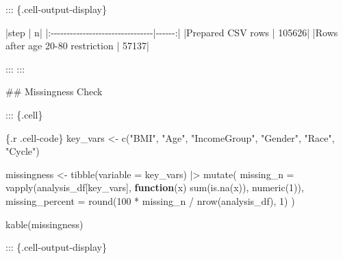 \documentclass[
  letterpaper,
  DIV=11,
  numbers=noendperiod,
  oneside]{scrreprt}
\newenvironment{Shaded}{\begin{snugshade}}{\end{snugshade}}
\newcommand{\AttributeTok}[1]{\textcolor[rgb]{0.40,0.45,0.13}{#1}}
\newcommand{\ControlFlowTok}[1]{\textcolor[rgb]{0.00,0.23,0.31}{\textbf{#1}}}
\newcommand{\DecValTok}[1]{\textcolor[rgb]{0.68,0.00,0.00}{#1}}
\newcommand{\FunctionTok}[1]{\textcolor[rgb]{0.28,0.35,0.67}{#1}}
\newcommand{\InformationTok}[1]{\textcolor[rgb]{0.37,0.37,0.37}{#1}}
\newcommand{\NormalTok}[1]{\textcolor[rgb]{0.00,0.23,0.31}{#1}}
\newcommand{\OtherTok}[1]{\textcolor[rgb]{0.00,0.23,0.31}{#1}}
\newcommand{\PreprocessorTok}[1]{\textcolor[rgb]{0.68,0.00,0.00}{#1}}
\newcommand{\SpecialCharTok}[1]{\textcolor[rgb]{0.37,0.37,0.37}{#1}}
\newcommand{\StringTok}[1]{\textcolor[rgb]{0.13,0.47,0.30}{#1}}
\begin{document}
\begin{Shaded}
\begin{Highlighting}[numbers=left,,]
\NormalTok{::: \{.cell{-}output{-}display\}}


\PreprocessorTok{|}\NormalTok{step                             }\PreprocessorTok{|}\NormalTok{      n}\PreprocessorTok{|}
\PreprocessorTok{|:{-}{-}{-}{-}{-}{-}{-}{-}{-}{-}{-}{-}{-}{-}{-}{-}{-}{-}{-}{-}{-}{-}{-}{-}{-}{-}{-}{-}{-}{-}{-}{-}|{-}{-}{-}{-}{-}{-}:|}
\PreprocessorTok{|}\NormalTok{Prepared CSV rows                }\PreprocessorTok{|}\NormalTok{ 105626}\PreprocessorTok{|}
\PreprocessorTok{|}\NormalTok{Rows after age 20{-}80 restriction }\PreprocessorTok{|}\NormalTok{  57137}\PreprocessorTok{|}


\NormalTok{:::}
\NormalTok{:::}


\FunctionTok{\#\# Missingness Check}


\NormalTok{::: \{.cell\}}

\InformationTok{\textasciigrave{}\textasciigrave{}\textasciigrave{}\{.r .cell{-}code\}}
\NormalTok{key\_vars }\OtherTok{\textless{}{-}} \FunctionTok{c}\NormalTok{(}\StringTok{"BMI"}\NormalTok{, }\StringTok{"Age"}\NormalTok{, }\StringTok{"IncomeGroup"}\NormalTok{, }\StringTok{"Gender"}\NormalTok{, }\StringTok{"Race"}\NormalTok{, }\StringTok{"Cycle"}\NormalTok{)}

\NormalTok{missingness }\OtherTok{\textless{}{-}} \FunctionTok{tibble}\NormalTok{(}\AttributeTok{variable =}\NormalTok{ key\_vars) }\SpecialCharTok{|\textgreater{}}
  \FunctionTok{mutate}\NormalTok{(}
    \AttributeTok{missing\_n =} \FunctionTok{vapply}\NormalTok{(analysis\_df[key\_vars], }\ControlFlowTok{function}\NormalTok{(x) }\FunctionTok{sum}\NormalTok{(}\FunctionTok{is.na}\NormalTok{(x)), }\FunctionTok{numeric}\NormalTok{(}\DecValTok{1}\NormalTok{)),}
    \AttributeTok{missing\_percent =} \FunctionTok{round}\NormalTok{(}\DecValTok{100} \SpecialCharTok{*}\NormalTok{ missing\_n }\SpecialCharTok{/} \FunctionTok{nrow}\NormalTok{(analysis\_df), }\DecValTok{1}\NormalTok{)}
\NormalTok{  )}

\FunctionTok{kable}\NormalTok{(missingness)}
\InformationTok{\textasciigrave{}\textasciigrave{}\textasciigrave{}}

\NormalTok{::: \{.cell{-}output{-}display\}}



\end{Highlighting}
\end{Shaded}
\end{document}
